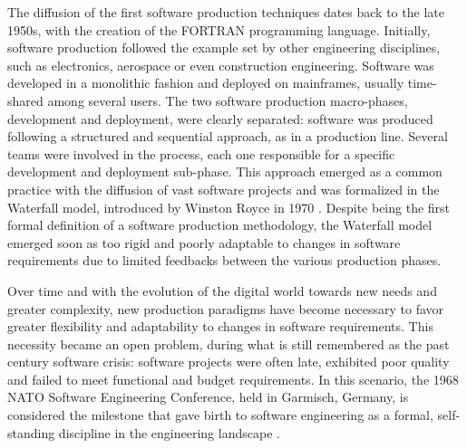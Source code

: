 The diffusion of the first software production techniques dates back to the late 1950s, with the creation of the FORTRAN programming language.
Initially, software production followed the example set by other engineering disciplines, such as electronics, aerospace or even construction engineering. Software was developed in a monolithic fashion and deployed on mainframes, usually time-shared among several users. 
The two software production macro-phases, development and deployment, were clearly separated: software was produced following a structured and sequential approach, as in a production line. Several teams were involved in the process, each one responsible for a specific development and deployment sub-phase.  
This approach emerged as a common practice with the diffusion of vast software projects and was formalized in the Waterfall model, introduced by Winston Royce in 1970 \cite{royce1987managing}.
Despite being the first formal definition of a software production methodology, the Waterfall model emerged soon as too rigid and poorly adaptable to changes in software requirements due to limited feedbacks between the various production phases.

Over time and with the evolution of the digital world towards new needs and greater complexity, new production paradigms have become necessary to favor greater flexibility and adaptability to changes in software requirements. 
This necessity became an open problem, during what is still remembered as the past century software crisis: software projects were often late, exhibited poor quality and failed to meet functional and budget requirements.
In this scenario, the 1968 NATO Software Engineering Conference, held in Garmisch, Germany, is considered the milestone that gave birth to software engineering as a formal, self-standing discipline in the engineering landscape \cite{nato1968}.

